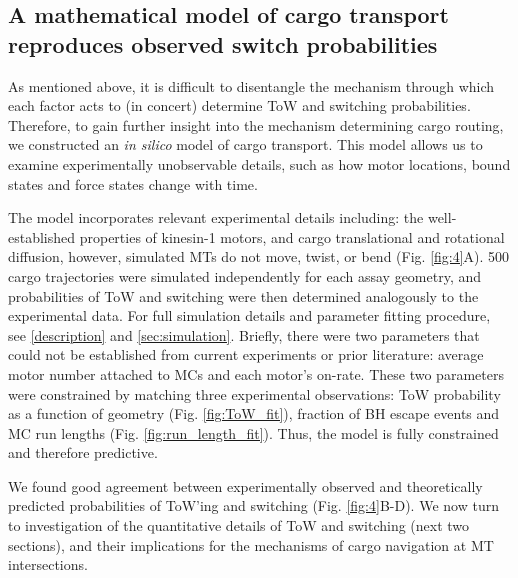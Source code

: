\subsection{A mathematical model of cargo transport reproduces observed switch probabilities}

As mentioned above, it is difficult to disentangle the mechanism through which each factor acts to (in concert) determine ToW and switching probabilities. Therefore, to gain further insight into the mechanism determining cargo routing, we constructed an \textit{in silico} model of cargo transport. This model allows us to examine experimentally unobservable details, such as how motor locations, bound states and force states change with time.

The model incorporates relevant experimental details including: the well-established properties of kinesin-1 motors, and cargo translational and rotational diffusion, however, simulated MTs do not move, twist, or bend (Fig. \ref{fig:4}A). 500 cargo trajectories were simulated independently for each assay geometry, and probabilities of ToW and switching were then determined analogously to the experimental data. For full simulation details and parameter fitting procedure, see \ref{description} and \ref{sec:simulation}. Briefly, there were two parameters that could not be established from current experiments or prior literature: average motor number attached to MCs and each motor's on-rate. These two parameters were constrained by matching three experimental observations: ToW probability as a function of geometry (Fig. \ref{fig:ToW_fit}), fraction of BH escape events and MC run lengths (Fig. \ref{fig:run_length_fit}). Thus, the model is fully constrained and therefore predictive.

We found good agreement between experimentally observed and theoretically predicted probabilities of ToW'ing and switching (Fig. \ref{fig:4}B-D). We now turn to investigation of the quantitative details of ToW and switching (next two sections), and their implications for the mechanisms of cargo navigation at MT intersections.

